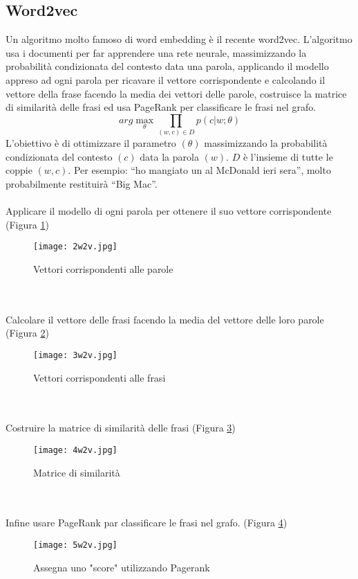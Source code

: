 \subsection{Word2vec}
\label{word2vec}
Un algoritmo molto famoso di word embedding è il recente word2vec. L’algoritmo usa i documenti per far apprendere una rete neurale, massimizzando la probabilità condizionata del contesto data una parola, applicando il modello appreso ad ogni parola per ricavare il vettore corrispondente e calcolando il vettore della frase facendo la media dei vettori delle parole, costruisce la matrice di similarità delle frasi ed usa PageRank per classificare le frasi nel grafo.
\begin{equation}
   arg\max_{\theta} \prod_{\left ( w, c \right ) \in D} p\left ( c|w; \theta \right )
\end{equation}
L’obiettivo è di ottimizzare il parametro $ \left (\theta \right )$ massimizzando la probabilità condizionata del contesto $\left ( c \right )$ data la parola $\left ( w \right )$. $D$ è l’insieme di tutte le coppie $\left ( w, c \right )$. 
Per esempio: “ho mangiato un \underline{\hspace{1cm}}  al McDonald ieri sera”, molto probabilmente restituirà “Big Mac”.
\\\\
Applicare il modello di ogni parola per ottenere il suo vettore corrispondente (Figura \ref{2w2v})
\begin{figure}[htb]
	\centering
	\texttt{[image: 2w2v.jpg]}
	\caption{Vettori corrispondenti alle parole}
	\label{2w2v}
\end{figure}
\\\\
Calcolare il vettore delle frasi facendo la media del vettore delle loro parole (Figura \ref{3w2v})
\begin{figure}[htb]
	\centering
	\texttt{[image: 3w2v.jpg]}
	\caption{Vettori corrispondenti alle frasi}
	\label{3w2v}
\end{figure}
\\\\
Costruire la matrice di similarità delle frasi (Figura \ref{4w2v})
\begin{figure}[htb]
	\centering
	\texttt{[image: 4w2v.jpg]}
	\caption{Matrice di similarità}
	\label{4w2v}
\end{figure}
\\\\
Infine usare PageRank par classificare le frasi nel grafo.
 (Figura \ref{5w2v})
\begin{figure}[htb]
	\centering
	\texttt{[image: 5w2v.jpg]}
	\caption{Assegna uno "score" utilizzando Pagerank}
	\label{5w2v}
\end{figure}

